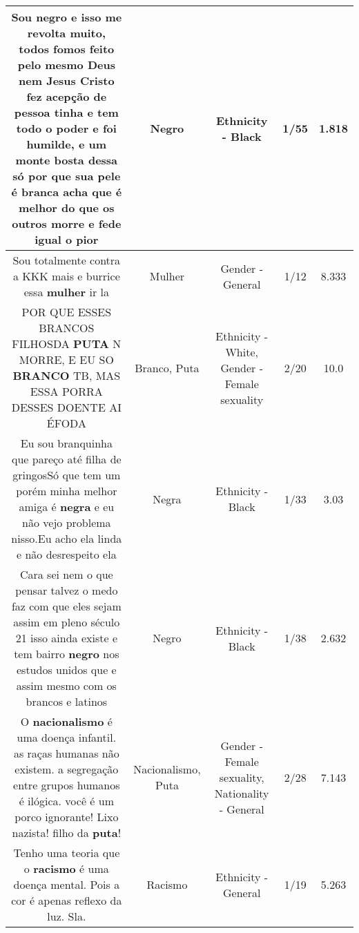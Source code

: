 \documentclass[11pt]{article}
\newlength\mylength
\begin{document}
\begin{center}
\begin{longtable}{|C{.65\mylength}|C{.30\mylength}|C{.12\mylength}|C{.12\mylength}|C{.12\mylength}|}
  \small Sou \textbf{negro} e isso me revolta muito, todos fomos feito pelo mesmo Deus nem Jesus Cristo fez acepção de pessoa tinha e tem todo o poder e foi humilde, e um monte bosta dessa só por que sua pele é branca acha que é melhor do que os outros morre e fede igual o pior\normalsize   & Negro & Ethnicity - Black & 1/55 & 1.818 \\  \hline
  \small Sou totalmente contra a KKK mais e burrice essa \textbf{mulher} ir la\normalsize   & Mulher & Gender - General & 1/12 & 8.333 \\  \hline
  \small POR QUE ESSES BRANCOS FILHOSDA \textbf{PUTA} N MORRE, E EU SO \textbf{BRANCO} TB, MAS ESSA PORRA DESSES DOENTE AI ÉFODA\normalsize   & Branco, Puta & Ethnicity - White, Gender - Female sexuality & 2/20 & 10.0 \\  \hline
  \small Eu sou branquinha que pareço até filha de gringosSó que tem um porém minha melhor amiga é \textbf{negra} e eu não vejo problema nisso.Eu acho ela linda e não desrespeito ela\normalsize   & Negra & Ethnicity - Black & 1/33 & 3.03 \\  \hline
  \small Cara sei nem o que pensar talvez o medo faz com que eles sejam assim em pleno século 21 isso ainda existe e tem bairro \textbf{negro} nos estudos unidos que e assim mesmo com os brancos e latinos\normalsize   & Negro & Ethnicity - Black & 1/38 & 2.632 \\  \hline
  \small O \textbf{nacionalismo} é uma doença infantil. as raças humanas não existem. a segregação entre grupos humanos é ilógica. você é um porco ignorante! Lixo nazista! filho da \textbf{puta}!\normalsize   & Nacionalismo, Puta & Gender - Female sexuality, Nationality - General & 2/28 & 7.143 \\  \hline
  \small Tenho uma teoria que o \textbf{racismo} é uma doença mental. Pois a cor é apenas reflexo da luz. Sla.\normalsize   & Racismo & Ethnicity - General & 1/19 & 5.263 \\  \hline

\end{longtable}
\end{center}
\end{document}
